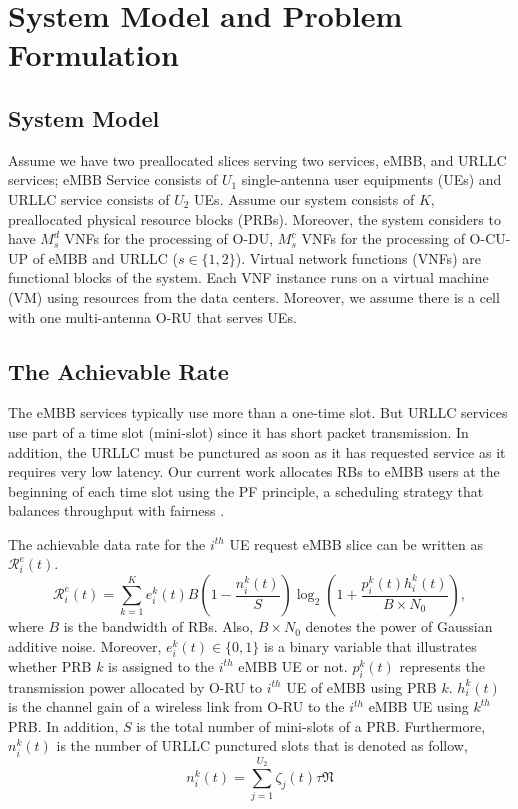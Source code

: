 \documentclass[conference]{IEEEtran}
\begin{document}
\section{System Model and Problem Formulation}
\subsection{System Model}
Assume we have two preallocated slices serving two services, eMBB, and URLLC services; 
eMBB Service consists of $U_{1}$ single-antenna user equipments (UEs) and URLLC service consists of $U_2$ UEs.
Assume our system consists of $K$, preallocated physical resource blocks (PRBs). Moreover, the system considers to have $M_s^{d}$ VNFs for the processing of O-DU, $M_s^{c}$ VNFs for the processing of O-CU-UP of eMBB and URLLC ($ s \in \{1, 2\}$). 
Virtual network functions (VNFs) are functional blocks of the system. Each VNF instance runs on a virtual machine (VM) using resources from the data centers. 
Moreover, we assume there is a cell with one multi-antenna O-RU that serves UEs.
\subsection{The Achievable Rate}
The eMBB services typically use more than a one-time slot. But URLLC services use part of a time slot (mini-slot) since it has short packet transmission. In addition, the URLLC must be punctured as soon as it has requested service as it requires very low latency.
Our current work allocates RBs to eMBB users at the beginning of each time slot using the PF principle, a scheduling strategy that balances throughput with fairness \cite{shi2022risk}.

The achievable data rate for the $i^{th}$ UE request eMBB slice can be written as $\mathcal{R}_{i}^{e}(t)$.
\begin{equation}\label{eq1}
\mathcal{R}_{i}^e(t) = \sum_{k = 1}^K e^k_i(t) B (1-\frac{n^k_i(t)}{S}) \log_2({1+\frac{p^k_i(t)h^k_i(t)}{B \times N_0}}),
\end{equation}
where $B$ is the bandwidth of RBs. Also, $B\times N_0$ denotes the power of Gaussian additive noise. 
Moreover, $e^k_i(t)\in \{0,1\}$ is a binary variable that illustrates whether PRB $k$ is assigned to the $i^{th}$ eMBB UE or not. 
$p^k_i(t)$ represents the transmission power allocated by O-RU to $i^{th}$ UE of eMBB using PRB $k$.
$h^k_i(t)$ is the channel gain of a wireless link from 
O-RU to the $i^{th}$ eMBB UE using $k^{th}$ PRB. In addition, $S$ is the total number of mini-slots of a PRB. 
Furthermore, $n^k_i(t)$ is the number of URLLC punctured slots that is denoted as follow,
\begin{equation}
n^k_i(t) = \sum_{j=1}^{U_2}{\zeta}_j(t)\tau \mathfrak{N} 
\end{equation} 
\end{document}
